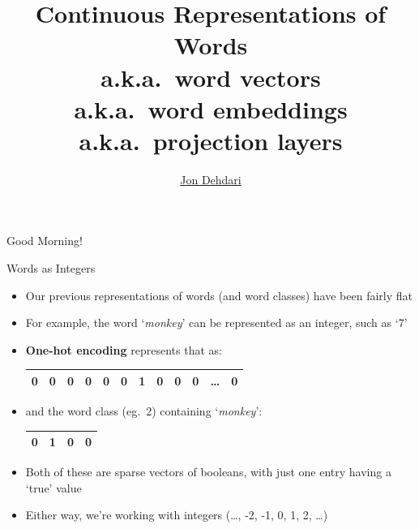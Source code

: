 \documentclass[xcolor=pdftex,x11names,table,hyperref]{beamer}
\begin{document}
\title{Continuous Representations of Words \\[1.5em]
	\small{a.k.a.\ word vectors \\
		a.k.a.\ word embeddings \\
		a.k.a.\ projection layers \\
	}
 }
\author{\href{http://jon.dehdari.org}{Jon Dehdari}}
\frame{\titlepage}

\begin{frame}{Good Morning!}
	\begin{center}
	\end{center}
\end{frame}

\begin{frame}{Words as Integers}
\begin{itemize}
	\item Our previous representations of words (and word classes) have been fairly flat
	\item For example, the word `\textit{monkey}' can be represented as an integer, such as `7'
	\pause
	\item \textbf{One-hot encoding} represents that as: \\[0.4em]
		\begin{tabular}{|c|c|c|c|c|c|c|c|c|c|c|c|}
		    \hline
			0 & 0 & 0 & 0 & 0 & 0 & 1 & 0 & 0 & 0 & \ldots & 0 \\
		    \hline
		\end{tabular}
	\pause

\item and the word class (eg.\ 2) containing `\textit{monkey}': \\[0.4em]
		\begin{tabular}{|c|c|c|c|}
		    \hline
			0 & 1 & 0 & 0 \\
		    \hline
		\end{tabular}

	\pause
	\item Both of these are sparse vectors of booleans, with just one entry having a `true' value
	\pause
	\item Either way, we're working with integers {\small (\ldots, -2, -1, 0, 1, 2, \ldots)}
\end{itemize}
\end{frame}
\end{document}
